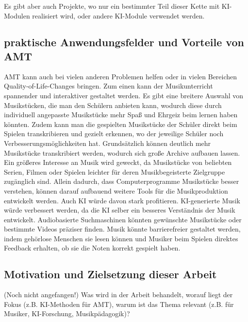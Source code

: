 Es gibt aber auch Projekte, wo nur ein bestimmter Teil dieser Kette mit KI-Modulen realisiert wird,
oder andere KI-Module verwendet werden.


\subsection{praktische Anwendungsfelder und Vorteile von AMT}
AMT kann auch bei vielen anderen Problemen helfen
oder in vielen Bereichen Quality-of-Life-Changes bringen.
Zum einen kann der Musikunterricht spannender und interaktiver gestaltet werden.
Es gibt eine breitere Auswahl von Musikstücken, die man den Schülern anbieten kann,
wodurch diese durch individuell angepasste Musikstücke mehr Spaß und Ehrgeiz beim lernen haben könnten.
Zudem kann man die gespielten Musikstücke der Schüler direkt beim Spielen transkribieren und gezielt erkennen,
wo der jeweilige Schüler noch Verbesserungsmöglichkeiten hat.
Grundsätzlich können deutlich mehr Musikstücke transkribiert werden,
wodurch sich große Archive aufbauen lassen.
Ein größeres Interesse an Musik wird geweckt, da Musikstücke von beliebten Serien, Filmen oder Spielen
leichter für deren Musikbegeisterte Zielgruppe zugänglich sind.
Allein dadurch, dass Computerprogramme Musikstücke besser verstehen,
können darauf aufbauend weitere Tools für die Musikproduktion entwickelt werden.
Auch KI würde davon stark profitieren.
KI-generierte Musik würde verbessert werden, da die KI selber ein besseres Verständnis der Musik entwickelt.
Audiobasierte Suchmaschinen könnten gewünschte Musikstücke oder bestimmte Videos präziser finden.
Musik könnte barrierefreier gestaltet werden,
indem gehörlose Menschen sie lesen können und Musiker beim Spielen direktes Feedback erhalten,
ob sie die Noten korrekt gespielt haben.


\subsection{Motivation und Zielsetzung dieser Arbeit} (Noch nicht angefangen!)
Was wird in der Arbeit behandelt, worauf liegt der Fokus (z.B. KI-Methoden für AMT), warum ist das Thema relevant (z.B. für Musiker, KI-Forschung, Musikpädagogik)?


